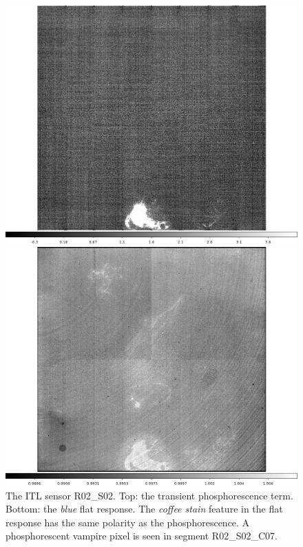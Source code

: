\begin{figure}[!htbp]
\centering
\begin{minipage}{1.0\textwidth}    
  \centering
  \includegraphics[width=.6\linewidth]{figures/phosphorescence-survey/stains_phos_R02_S02.png}    
\end{minipage}
\begin{minipage}{1.0\textwidth}
  \centering
  \includegraphics[width=.6\linewidth]{figures/phosphorescence-survey/stains_abs_R02_S02.png}
\end{minipage}
\caption{The ITL sensor R02\_S02. Top: the transient phosphorescence term. Bottom: the {\it blue} flat response. The {\it coffee stain} feature in the flat response has the same polarity as the phosphorescence. A phosphorescent vampire pixel is seen in segment R02\_S02\_C07.}
\label{fig:phos:stains:R02S02}
\end{figure}

